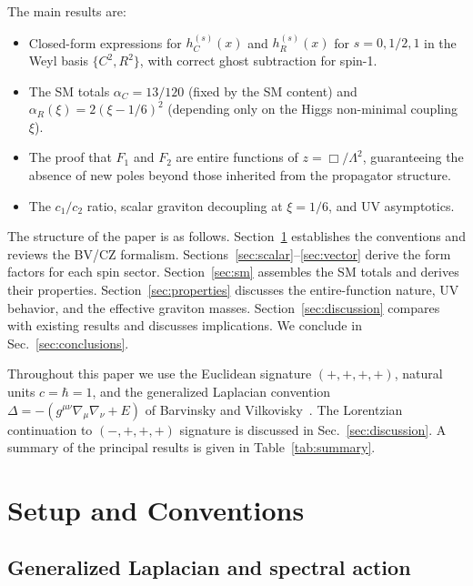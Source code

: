 \documentclass[aps,prd,twocolumn,superscriptaddress,nofootinbib,floatfix]{revtex4-2}
\begin{document}
The main results are:
\begin{itemize}
\item Closed-form expressions for $h_C^{(s)}(x)$ and $h_R^{(s)}(x)$ for
  $s = 0, 1/2, 1$ in the Weyl basis $\{C^2, R^2\}$, with correct ghost
  subtraction for spin-1.
\item The SM totals $\alpha_C = 13/120$ (fixed by the SM content) and
  $\alpha_R(\xi) = 2(\xi - 1/6)^2$ (depending only on the Higgs non-minimal
  coupling $\xi$).
\item The proof that $F_1$ and $F_2$ are entire functions of $z = \Box/\Lambda^2$,
  guaranteeing the absence of new poles beyond those inherited from the
  propagator structure.
\item The $c_1/c_2$ ratio, scalar graviton decoupling at $\xi = 1/6$, and UV
  asymptotics.
\end{itemize}

The structure of the paper is as follows. Section~\ref{sec:setup} establishes
the conventions and reviews the BV/CZ formalism. Sections~\ref{sec:scalar}--\ref{sec:vector} derive the form factors for each spin sector. Section~\ref{sec:sm}
assembles the SM totals and derives their properties. Section~\ref{sec:properties}
discusses the entire-function nature, UV behavior, and the effective graviton
masses. Section~\ref{sec:discussion} compares with existing results and
discusses implications. We conclude in Sec.~\ref{sec:conclusions}.

Throughout this paper we use the Euclidean signature $(+,+,+,+)$, natural
units $c = \hbar = 1$, and the generalized Laplacian convention
$\Delta = -(g^{\mu\nu}\nabla_\mu\nabla_\nu + E)$ of Barvinsky and
Vilkovisky~\cite{Barvinsky:1985an}. The Lorentzian continuation to
$(-,+,+,+)$ signature is discussed in Sec.~\ref{sec:discussion}. A summary
of the principal results is given in Table~\ref{tab:summary}.


\section{Setup and Conventions}
\label{sec:setup}

\subsection{Generalized Laplacian and spectral action}
\end{document}
